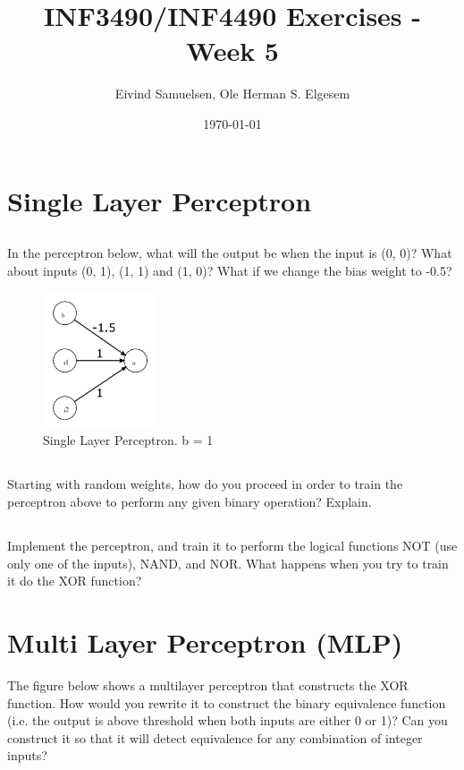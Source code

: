 \documentclass{article}           %
\title{\vspace{-2cm}INF3490/INF4490 Exercises - Week 5}
\author{Eivind Samuelsen, Ole Herman S. Elgesem}
\date{\today}
\newcommand\marginsymbol[1][0pt]{%
  \tabto*{0cm}\makebox[\dimexpr-1cm-#1\relax][r]{$\mathbb{P}$}\tabto*{\TabPrevPos}}
\begin{document}
    \renewcommand\marginsymbol[1][0pt]{%
  \tabto*{0cm}\makebox[-1cm][c]{$\mathbb{P}$}\tabto*{\TabPrevPos}}

\maketitle


\section{Single Layer Perceptron}
\subsection{}
In the perceptron below, what will the output be when the input is (0, 0)?
What about inputs (0, 1), (1, 1) and (1, 0)?
What if we change the bias weight to -0.5?

\begin{figure}[H]
\begin{center}
\includegraphics[width=0.3\textwidth]{fig1.png}
\caption{Single Layer Perceptron. b = 1 }
\label{fig:slp}
\end{center}
\end{figure}

\subsection{}
Starting with random weights, how do you proceed in order to train the
perceptron above to perform any given binary operation? Explain.
\subsection{\marginsymbol}
Implement the perceptron, and train it to perform the logical functions NOT
(use only one of the inputs), NAND, and NOR. What happens when you try to
train it do the XOR function?

\section{Multi Layer Perceptron (MLP)}
The figure below shows a multilayer perceptron that constructs the XOR function.
How would you rewrite it to construct the binary equivalence function
(i.e. the output is above threshold when both inputs are either 0 or 1)? Can
you construct it so that it will detect equivalence for any combination of integer
inputs?
\end{document}

